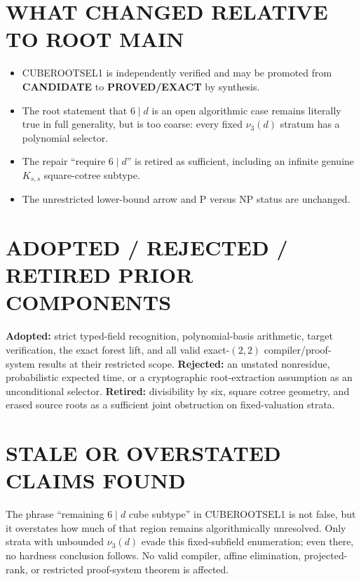 \documentclass[11pt]{article}
\newcommand{\EXACT}{\textbf{PROVED/EXACT}}
\newcommand{\CAND}{\textbf{CANDIDATE}}
\begin{document}
\section{WHAT CHANGED RELATIVE TO ROOT MAIN}
\begin{itemize}
\item CUBEROOTSEL1 is independently verified and may be promoted from
\CAND{} to \EXACT{} by synthesis.
\item The root statement that $6\mid d$ is an open algorithmic case remains
literally true in full generality, but is too coarse: every fixed
$\nu_3(d)$ stratum has a polynomial selector.
\item The repair ``require $6\mid d$'' is retired as sufficient, including
an infinite genuine $K_{s,s}$ square-cotree subtype.
\item The unrestricted lower-bound arrow and P versus NP status are unchanged.
\end{itemize}

\section{ADOPTED / REJECTED / RETIRED PRIOR COMPONENTS}
\textbf{Adopted:} strict typed-field recognition, polynomial-basis
arithmetic, target verification, the exact forest lift, and all valid
exact-$(2,2)$ compiler/proof-system results at their restricted scope.
\textbf{Rejected:} an unstated nonresidue, probabilistic expected time, or a
cryptographic root-extraction assumption as an unconditional selector.
\textbf{Retired:} divisibility by six, square cotree geometry, and erased
source roots as a sufficient joint obstruction on fixed-valuation strata.

\section{STALE OR OVERSTATED CLAIMS FOUND}
The phrase ``remaining $6\mid d$ cube subtype'' in CUBEROOTSEL1 is not false,
but it overstates how much of that region remains algorithmically unresolved.
Only strata with unbounded $\nu_3(d)$ evade this fixed-subfield enumeration;
even there, no hardness conclusion follows.  No valid compiler, affine
elimination, projected-rank, or restricted proof-system theorem is affected.
\end{document}

